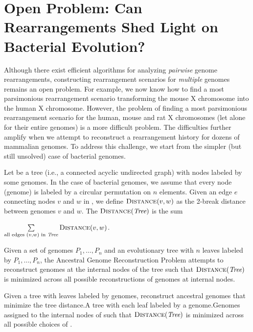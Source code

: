 \FloatBarrier
\section{Open Problem: Can Rearrangements Shed Light on Bacterial Evolution?}
\label{sec:rearrangements_open_problem}

Although there exist efficient algorithms for analyzing \emph{pairwise} genome rearrangements, constructing rearrangement scenarios for \emph{multiple} genomes remains an open problem. For example, we now know how to find a most parsimonious rearrangement scenario transforming the mouse X chromosome into the human X chromosome. However, the problem of finding a most parsimonious rearrangement scenario for the human, mouse and rat X chromosomes (let alone for their entire genomes) is a more difficult problem. The difficulties further amplify when we attempt to reconstruct a rearrangement history for dozens of mammalian genomes. To address this challenge, we start from the simpler (but still unsolved) case of bacterial genomes.

Let  be a tree (i.e., a connected acyclic undirected graph) with nodes labeled by some genomes. In the case of bacterial genomes, we assume that every node (genome) is labeled by a circular permutation on $n$ elements. Given an edge $e$ connecting nodes $v$ and $w$ in , we define $\text{\scshape Distance}(v, w)$ as the 2-break distance between genomes $v$ and $w$.  The  $\text{\scshape Distance}(\textit{Tree})$ is the sum 

\begin{center}
$\sum\limits_{\text{all edges }(v, w)\text{ in \textit{Tree}}}{\text{\scshape Distance}(v, w)}$.
\end{center}

Given a set of genomes $P_1, \ldots ,P_n$ and an evolutionary tree  with $n$ leaves labeled by $P_1, \ldots ,P_n$, the Ancestral Genome Reconstruction Problem attempts to reconstruct  genomes at the internal nodes of the tree such that $\text{\scshape Distance}(\textit{Tree})$ is minimized across all possible reconstructions of genomes at internal nodes.\\

\begin{problem}{Given a tree with leaves labeled by genomes, reconstruct ancestral genomes that minimize the tree distance.}{A tree  with each leaf labeled by a genome.}{Genomes  assigned to the internal nodes of  such that $\text{\scshape Distance}(\textit{Tree})$ is minimized across all possible choices of .}
\end{problem}

